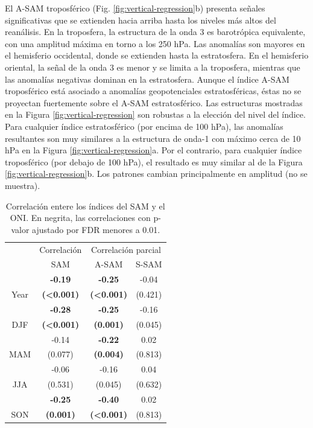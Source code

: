 \documentclass[12pt,oneside]{reedthesis}
\begin{document}
El A-SAM troposférico (Fig. \ref{fig:vertical-regression}b) presenta señales significativas que se extienden hacia arriba hasta los niveles más altos del reanálisis.
En la troposfera, la estructura de la onda 3 es barotrópica equivalente, con una amplitud máxima en torno a los 250 hPa.
Las anomalías son mayores en el hemisferio occidental, donde se extienden hasta la estratosfera.
En el hemisferio oriental, la señal de la onda 3 es menor y se limita a la troposfera, mientras que las anomalías negativas dominan en la estratosfera.
Aunque el índice A-SAM troposférico está asociado a anomalías geopotenciales estratosféricas, éstas no se proyectan fuertemente sobre el A-SAM estratosférico.
Las estructuras mostradas en la Figura \ref{fig:vertical-regression} son robustas a la elección del nivel del índice.
Para cualquier índice estratosférico (por encima de 100 hPa), las anomalías resultantes son muy similares a la estructura de onda-1 con máximo cerca de 10 hPa en la Figura \ref{fig:vertical-regression}a.
Por el contrario, para cualquier índice troposférico (por debajo de 100 hPa), el resultado es muy similar al de la Figura \ref{fig:vertical-regression}b.
Los patrones cambian principalmente en amplitud (no se muestra).




\begin{table}

\caption{\label{tab:enso-cor-table}Correlación entere los índices del SAM y el ONI.
En negrita, las correlaciones con p-valor ajustado por FDR menores a 0.01.}
\centering
\begin{tabular}[t]{c>{}c>{}c>{}c}
\toprule
\multicolumn{1}{c}{ } & \multicolumn{1}{c}{Correlación} & \multicolumn{2}{c}{Correlación parcial} \\
\cmidrule(l{3pt}r{3pt}){2-2} \cmidrule(l{3pt}r{3pt}){3-4}
 & SAM & A-SAM & S-SAM\\
\midrule
 & \textbf{-0.19} & \textbf{-0.25} & -0.04\\
\cmidrule{2-4}
\multirow[t]{-2}{*}{\centering\arraybackslash Year} & \textbf{(<0.001)} & \textbf{(<0.001)} & (0.421)\\
\cmidrule{1-4}
 & \textbf{-0.28} & \textbf{-0.25} & -0.16\\
\cmidrule{2-4}
\multirow[t]{-2}{*}{\centering\arraybackslash DJF} & \textbf{(<0.001)} & \textbf{(0.001)} & (0.045)\\
\cmidrule{1-4}
 & -0.14 & \textbf{-0.22} & 0.02\\
\cmidrule{2-4}
\multirow[t]{-2}{*}{\centering\arraybackslash MAM} & (0.077) & \textbf{(0.004)} & (0.813)\\
\cmidrule{1-4}
 & -0.06 & -0.16 & 0.04\\
\cmidrule{2-4}
\multirow[t]{-2}{*}{\centering\arraybackslash JJA} & (0.531) & (0.045) & (0.632)\\
\cmidrule{1-4}
 & \textbf{-0.25} & \textbf{-0.40} & 0.02\\
\cmidrule{2-4}
\multirow[t]{-2}{*}{\centering\arraybackslash SON} & \textbf{(0.001)} & \textbf{(<0.001)} & (0.813)\\
\bottomrule
\end{tabular}
\end{table}
\end{document}
